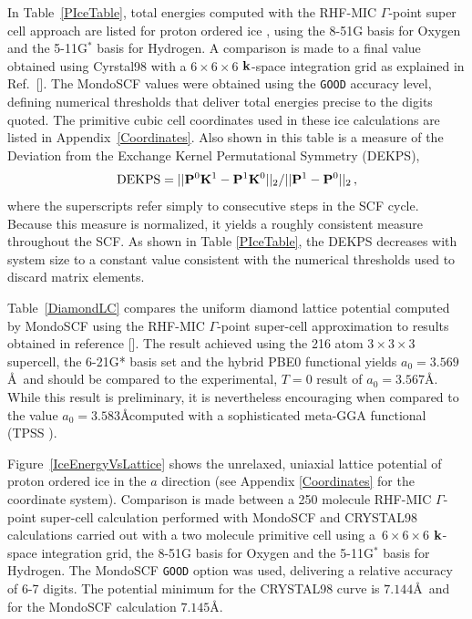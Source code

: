 \documentclass[prb,aps,nobibnotes,twocolumn,doublespace,twocolumngrid,superbib,showpacs]{revtex4}
\begin{document}
In Table~\ref{PIceTable}, total energies computed with the RHF-MIC $\Gamma$-point
super cell approach are listed for proton ordered ice \cite{SCasassa97}, using the 8-51G basis 
for Oxygen and the 5-11G$^*$ basis for Hydrogen.  A comparison is made to a final 
value obtained using {\sc Cyrstal98} with a $6\times6\times6$ ${\bf k}$-space integration grid
as explained in Ref.~[].  The {\sc MondoSCF} values were obtained 
using the {\tt GOOD} accuracy level, defining numerical thresholds that deliver total energies
precise to the digits quoted.
The primitive cubic cell coordinates used in these ice calculations are listed in Appendix~\ref{Coordinates}.   
Also shown in this table is a measure of the 
Deviation from the Exchange Kernel Permutational Symmetry (DEKPS),
\begin{equation}
{\rm DEKPS} = || {\bf P}^0 {\bf K}^1-{\bf P}^1 {\bf K}^0 ||_2/|| {\bf P}^1 - {\bf P}^0||_2 \, ,
\end{equation}
where the superscripts refer simply to consecutive steps in the SCF cycle.  Because this measure
is normalized, it yields a roughly consistent measure throughout the SCF.  As shown in Table \ref{PIceTable},
the DEKPS decreases with system size to a constant value consistent with the numerical thresholds used to 
discard matrix elements.   

Table~\ref{DiamondLC}  compares the uniform diamond lattice potential computed 
by MondoSCF using the RHF-MIC $\Gamma$-point super-cell approximation to results obtained in 
reference [].  The result achieved using the 216 atom $3 \times 3 \times 3$ 
supercell, the 6-21G* basis set and the hybrid PBE0 functional yields $a_0=3.569$\AA~and should be
compared to the experimental, $T=0$ result of $a_0=3.567$\AA.  While this result is preliminary, 
it is nevertheless encouraging when compared to the value $a_0=3.583$\AA computed with a sophisticated 
meta-GGA functional (TPSS \cite{JTao03}).

Figure~\ref{IceEnergyVsLattice} shows the unrelaxed, uniaxial lattice potential of 
proton ordered ice \cite{SCasassa97} in the $a$ direction (see Appendix \ref{Coordinates} 
for the coordinate system).  Comparison is made between a 250 molecule RHF-MIC $\Gamma$-point 
super-cell calculation performed with {\sc MondoSCF} and {\sc CRYSTAL98} calculations carried 
out with a two molecule primitive cell using a~$6\times6\times6$ ${\bf k}$-space integration grid, 
the 8-51G basis for Oxygen and the 5-11G${^*}$ basis for Hydrogen.  The {\sc MondoSCF} {\tt GOOD} 
option was used, delivering a relative accuracy of 6-7 digits. The potential minimum for the 
{\sc CRYSTAL98} curve is $7.144$\AA~and  for the {\sc MondoSCF} calculation $7.145$\AA.
\end{document}

